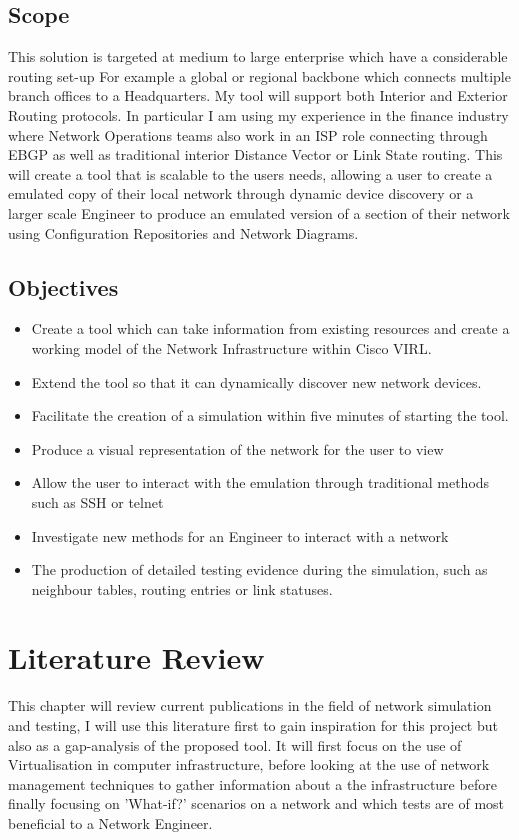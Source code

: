 \documentclass[11pt]{report}
\begin{document}
\section{Scope}

This solution is targeted at medium to large enterprise which have a considerable routing set-up For example a global or regional backbone which connects multiple branch offices to a Headquarters. My tool will support both Interior and Exterior Routing protocols. In particular I am using my experience in the finance industry where Network Operations teams also work in an ISP role connecting through EBGP as well as traditional interior Distance Vector or Link State routing. This will create a tool that is scalable to the users needs, allowing a user to create a emulated copy of their local network through dynamic device discovery or a larger scale Engineer to produce an emulated version of a section of their network using Configuration Repositories and Network Diagrams.

\section{Objectives}
\begin{itemize}
\item{Create a tool which can take information from existing resources and create a working model of the Network Infrastructure within Cisco VIRL.}
\item{Extend the tool so that it can dynamically discover new network devices.}
\item{Facilitate the creation of a simulation within five minutes of starting the tool.}
\item{Produce a visual representation of the network for the user to view}
\item{Allow the user to interact with the emulation through traditional methods such as SSH or telnet}
\item{Investigate new methods for an Engineer to interact with a network}
\item{The production of detailed testing evidence during the simulation, such as neighbour tables, routing entries or link statuses.}
\end{itemize}

\chapter{Literature Review}

This chapter will review current publications in the field of network simulation and testing, I will use this literature first to gain inspiration for this project but also as a gap-analysis of the proposed tool. It will first focus on the use of Virtualisation in computer infrastructure, before looking at the use of network management techniques to gather information about a the infrastructure before finally focusing on 'What-if?' scenarios on a network and which tests are of most beneficial to a Network Engineer.
\end{document}
